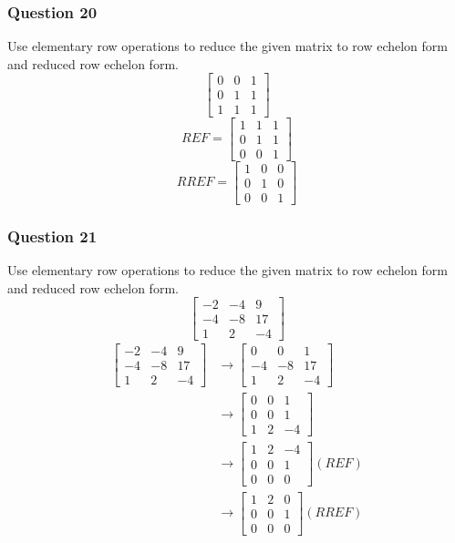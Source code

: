 \documentclass{math}
\begin{document}
\subsubsection*{Question 20}
Use elementary row operations to reduce the given matrix to row echelon form
and reduced row echelon form.
\[ \begin{bmatrix}
  0 & 0 & 1 \\
  0 & 1 & 1 \\
  1 & 1 & 1
\end{bmatrix} \]
\[ REF = \begin{bmatrix}
  1 & 1 & 1 \\
  0 & 1 & 1 \\
  0 & 0 & 1
\end{bmatrix} \]
\[ RREF = \begin{bmatrix}
  1 & 0 & 0 \\
  0 & 1 & 0 \\
  0 & 0 & 1
\end{bmatrix} \]

\subsubsection*{Question 21}
Use elementary row operations to reduce the given matrix to row echelon form
and reduced row echelon form.
\[ \begin{bmatrix}
  -2 & -4 & 9 \\
  -4 & -8 & 17 \\
  1 & 2 & -4
\end{bmatrix} \]
\begin{align*}
  \begin{bmatrix}
    -2 & -4 & 9 \\
    -4 & -8 & 17 \\
    1 & 2 & -4
  \end{bmatrix} &\to \begin{bmatrix}
    0 & 0 & 1 \\
    -4 & -8 & 17 \\
    1 & 2 & -4
  \end{bmatrix} \\
  &\to \begin{bmatrix}
    0 & 0 & 1 \\
    0 & 0 & 1 \\
    1 & 2 & -4
  \end{bmatrix} \\
  &\to \begin{bmatrix}
    1 & 2 & -4 \\
    0 & 0 & 1 \\
    0 & 0 & 0
  \end{bmatrix} (REF) \\
  &\to \begin{bmatrix}
    1 & 2 & 0 \\
    0 & 0 & 1 \\
    0 & 0 & 0
  \end{bmatrix} (RREF) \\
\end{align*}
\end{document}
